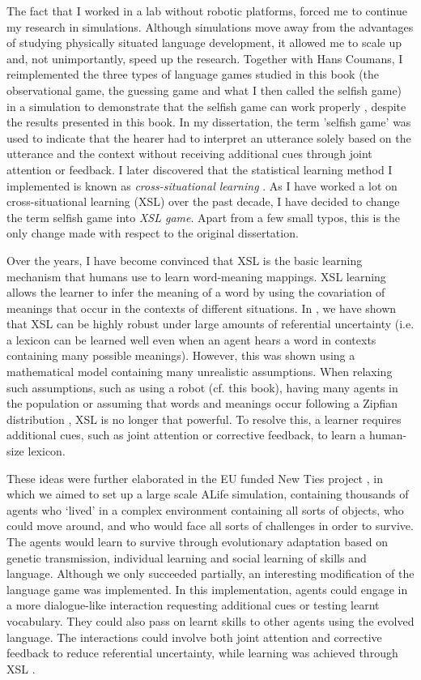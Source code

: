 The fact that I worked in a lab without robotic platforms, forced me to continue my research in simulations. Although simulations move away from the advantages of studying physically situated language development, it allowed me to scale up and, not unimportantly, speed up the research. 
Together with Hans Coumans, I reimplemented the three types of language games studied in this book (the observational game, the guessing game and what I then called the selfish game) in a simulation to demonstrate that the selfish game can work properly \citep{vogtcoumans:2003}, despite the results presented in this book. In my dissertation, the term 'selfish game' was used to indicate that the hearer had to interpret an utterance solely based on the utterance and the context without receiving additional cues through joint attention or feedback. I later discovered that the statistical learning method I implemented is known as {\em cross-situational learning} \citep{pinker:1989,siskind:1996}. As I have worked a lot on cross-situational learning (XSL) over the past decade, I have decided to change the term selfish game into {\em XSL game}. Apart from a few small typos, this is the only change made with respect to the original dissertation.

Over the years, I have become convinced that XSL is the basic learning mechanism that humans use to learn word-meaning mappings. XSL learning allows the learner to infer the meaning of a word by using the covariation of meanings that occur in the contexts of different situations. In \citet{smithetal:2006}, we have shown that XSL can be highly robust under large amounts of referential uncertainty (i.e. a lexicon can be learned well even when an agent hears a word in contexts containing many possible meanings). However, this was shown using a mathematical model containing many unrealistic assumptions. When relaxing such assumptions, such as using a robot (cf. this book), having many agents in the population \citep{vogtcoumans:2003} or assuming that words and meanings occur following a Zipfian distribution \citep{vogt:2012}, XSL is no longer that powerful. To resolve this, a learner requires additional cues, such as joint attention or corrective feedback, to learn a human-size lexicon. 

These ideas were further elaborated in the EU funded New Ties project \citep{gilbertetal:2006}, in which we aimed to set up a large scale ALife simulation, containing thousands of agents who ‘lived' in a complex environment containing all sorts of objects, who could move around, and who would face all sorts of challenges in order to survive. The agents would learn to survive through evolutionary adaptation based on genetic transmission, individual learning and social learning of skills and language. Although we only succeeded partially, an interesting modification of the language game was implemented. In this implementation, agents could engage in a more dialogue-like interaction requesting additional cues or testing learnt vocabulary. They could also pass on learnt skills to other agents using the evolved language. The interactions could involve both joint attention and corrective feedback to reduce referential uncertainty, while learning was achieved through XSL \cite{vogtdivina:2007,vogthaasdijk:2010}.


